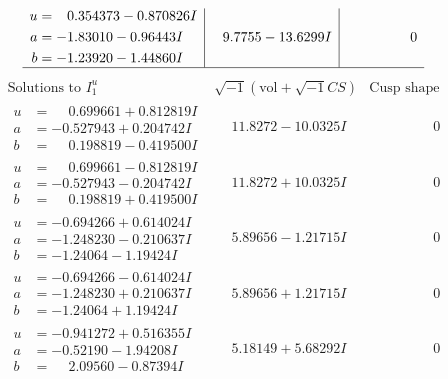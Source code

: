 \documentclass[1p]{elsarticle_modified}
\theoremstyle{definition}
\newcommand{\I}{\sqrt{-1}}
\begin{document}
$$\begin{array}{c|c|c}
\begin{aligned}
u &= \phantom{-}0.354373 - 0.870826 I \\
a &= -1.83010 - 0.96443 I \\
b &= -1.23920 - 1.44860 I\end{aligned}
 & \phantom{-}9.7755 - 13.6299 I & \phantom{-0.000000 } 0\\
 \hline 
 \end{array}$$\newpage$$\begin{array}{c|c|c}  
\text{Solutions to }I^u_{1}& \I (\text{vol} + \sqrt{-1}CS) & \text{Cusp shape}\\
 \hline 
\begin{aligned}
u &= \phantom{-}0.699661 + 0.812819 I \\
a &= -0.527943 + 0.204742 I \\
b &= \phantom{-}0.198819 - 0.419500 I\end{aligned}
 & \phantom{-}11.8272 - 10.0325 I & \phantom{-0.000000 } 0 \\ \hline\begin{aligned}
u &= \phantom{-}0.699661 - 0.812819 I \\
a &= -0.527943 - 0.204742 I \\
b &= \phantom{-}0.198819 + 0.419500 I\end{aligned}
 & \phantom{-}11.8272 + 10.0325 I & \phantom{-0.000000 } 0 \\ \hline\begin{aligned}
u &= -0.694266 + 0.614024 I \\
a &= -1.248230 - 0.210637 I \\
b &= -1.24064 - 1.19424 I\end{aligned}
 & \phantom{-}5.89656 - 1.21715 I & \phantom{-0.000000 } 0 \\ \hline\begin{aligned}
u &= -0.694266 - 0.614024 I \\
a &= -1.248230 + 0.210637 I \\
b &= -1.24064 + 1.19424 I\end{aligned}
 & \phantom{-}5.89656 + 1.21715 I & \phantom{-0.000000 } 0 \\ \hline\begin{aligned}
u &= -0.941272 + 0.516355 I \\
a &= -0.52190 - 1.94208 I \\
b &= \phantom{-}2.09560 - 0.87394 I\end{aligned}
 & \phantom{-}5.18149 + 5.68292 I & \phantom{-0.000000 } 0 \\ \hline\begin{aligned}

\end{aligned}
\end{array}$$
\end{document}
